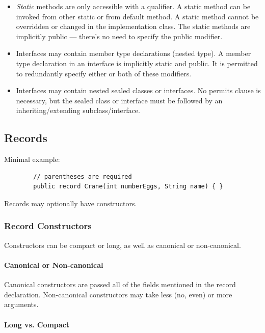 \documentclass{scrartcl}
\begin{document}
\begin{itemize}
    \item     \textit{Static} methods are only accessible with a qualifier. A static method can be invoked from other static or from default method. A static method cannot be overridden or changed in the implementation class. The static methods are implicitly public — there's no need to specify the public modifier.

    \item     Interfaces may contain member type declarations (nested type). A member type declaration in an interface is implicitly static and public. It is permitted to redundantly specify either or both of these modifiers.

    \item Interfaces may contain nested sealed classes or interfaces. No permits clause is necessary, but the sealed class or interface must be followed by an inheriting/extending subclass/interface.


\end{itemize}
\subsection{Records}

    Minimal example:

    \begin{lstlisting}
        // parentheses are required
        public record Crane(int numberEggs, String name) { }
    \end{lstlisting}

    Records may optionally have constructors.

\subsubsection{Record Constructors}

Constructors can be compact or long, as well as canonical or non-canonical.

\paragraph{Canonical or Non-canonical}

Canonical constructors are passed all of the fields mentioned in the record declaration.
Non-canonical constructors may take less (no, even) or more arguments.

\paragraph{Long vs. Compact}
\end{document}
